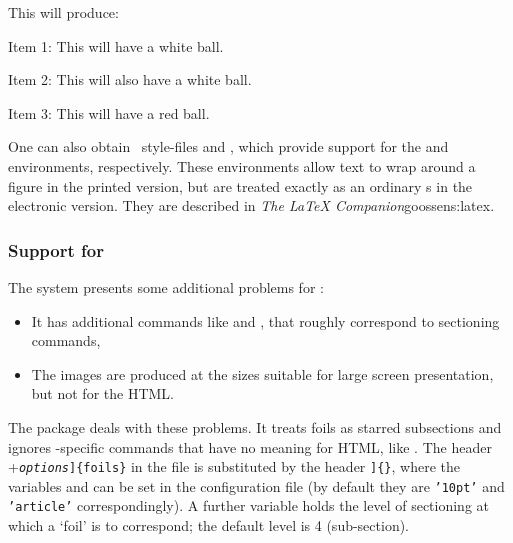 \noindent This will produce:\label{listExample}
\begin{htmllist}[WhiteBall]
\addtolength{\leftskip}{15pt}
\item[Item 1:] This will have a white ball.
\item[Item 2:] This will also have a white ball.
%
\item[Item 3:] This will have a red ball.
\end{htmllist}

%
%
%
\html{\\}%
\noindent
One can also obtain \LaTeXe\ style-files  and 
, which provide support for the 
and  environments, respectively.  These environments
allow text to wrap around a figure in the printed version, 
but are treated exactly as an ordinary s in the electronic version.  
They are described in %
{\emph{The \LaTeX{} Companion}}{}{goossens:latex}.%

\subsubsection{Support for \FoilTeX\label{sec:foils}}
%
 The \FoilTeX{} system presents some
additional problems for \latextohtml:
\begin{itemize}
\item It has additional commands like  and
  , that roughly correspond to sectioning commands,
\item The images are produced at the sizes suitable for large screen
  presentation, but not for the HTML.
\end{itemize}
The package  deals with these problems. It treats foils as
starred subsections and ignores \FoilTeX-specific commands that have no
meaning for HTML, like . The header
\Lc{documentclass[}+\texttt{\it options}\verb+]{foils}+ in the
 file is substituted by the header
\Lc{documentclass[}\verb+]{+\verb+}+,
where the variables  and  can be set
in the configuration file (by default they are \texttt{'10pt'} and
\texttt{'article'} correspondingly).
A further variable  holds the level of sectioning
at which a `foil' is to correspond; the default level is 4 (sub-section).

